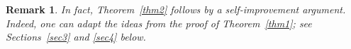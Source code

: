 \documentclass[12pt]{amsart}
\newtheorem{remark}[theorem]{Remark}
\begin{document}
\begin{remark}
In fact, Theorem~\ref{thm2} follows by a self-improvement argument. Indeed, one can adapt the ideas from the proof of Theorem~\ref{thm1}; see Sections~\ref{sec3} and \ref{sec4} below. 
\end{remark}









\end{document}
